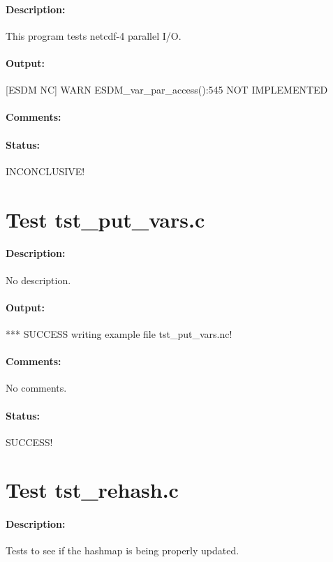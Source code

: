 \paragraph{Description:} This program tests netcdf-4 parallel I/O.

\paragraph{Output:} [ESDM NC] WARN ESDM\_var\_par\_access():545 NOT IMPLEMENTED

\paragraph{Comments:}

\paragraph{Status:} INCONCLUSIVE!

\section{Test tst\_put\_vars.c}

\paragraph{Description:} No description.

\paragraph{Output:} *** SUCCESS writing example file tst\_put\_vars.nc!

\paragraph{Comments:} No comments.

\paragraph{Status:} SUCCESS!

\section{Test tst\_rehash.c}

\paragraph{Description:} Tests to see if the hashmap is being properly updated.

